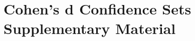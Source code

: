 \documentclass[11pt,a4paper]{report}      %
\begin{document}
\chapter{Cohen's d Confidence Sets Supplementary Material}





\end{document}
